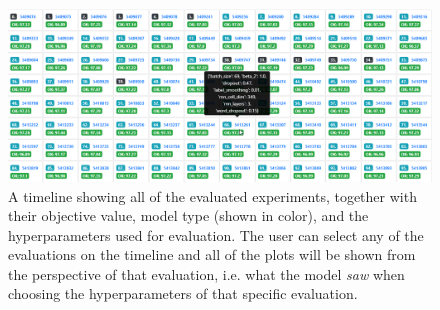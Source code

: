 \begin{figure}
	\begin{center}
		\includegraphics[width=1.0\textwidth]{images/timeline-view}
		\caption{A timeline showing all of the evaluated experiments, together with their objective value, model type (shown in color), and the hyperparameters used for evaluation. The user can select any of the evaluations on the timeline and all of the plots will be shown from the perspective of that evaluation, i.e. what the model \emph{saw} when choosing the hyperparameters of that specific evaluation.}
	\end{center}
\end{figure}
\label{figure:timeline-view}


